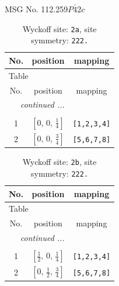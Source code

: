 \documentclass[fleqn,8pt]{jsarticle}
\begin{document}
\setcounter{MaxMatrixCols}{32}

\renewcommand{\tablename}{Table~}
\renewcommand{\figurename}{Figure~}
\begin{center}
\LARGE
MSG No. 112.259\quad$P\bar{4}2c$
\end{center}
\renewcommand{\arraystretch}{1.2}
\begin{longtable}{ccc}
\caption{Wyckoff site: {\tt 2a}, site symmetry: {\tt 222.}}
 \\
 \hline \hline
No. & position & mapping \\ \hline \endfirsthead

\multicolumn{2}{l}{\tablename\ \thetable{}} \\
 \hline \hline
No. & position & mapping \\ \hline \endhead

 \hline \hline
\multicolumn{2}{r}{\footnotesize\it continued ...} \\ \endfoot

 \hline \hline
\multicolumn{2}{r}{} \\ \endlastfoot

1 & $\left[ 0,\, 0,\, \frac{1}{4} \right]$ & {\tt [1,2,3,4]} \\ \hline
2 & $\left[ 0,\, 0,\, \frac{3}{4} \right]$ & {\tt [5,6,7,8]} \\
\end{longtable}
\renewcommand{\arraystretch}{1.2}
\begin{longtable}{ccc}
\caption{Wyckoff site: {\tt 2b}, site symmetry: {\tt 222.}}
 \\
 \hline \hline
No. & position & mapping \\ \hline \endfirsthead

\multicolumn{2}{l}{\tablename\ \thetable{}} \\
 \hline \hline
No. & position & mapping \\ \hline \endhead

 \hline \hline
\multicolumn{2}{r}{\footnotesize\it continued ...} \\ \endfoot

 \hline \hline
\multicolumn{2}{r}{} \\ \endlastfoot

1 & $\left[ \frac{1}{2},\, 0,\, \frac{1}{4} \right]$ & {\tt [1,2,3,4]} \\ \hline
2 & $\left[ 0,\, \frac{1}{2},\, \frac{3}{4} \right]$ & {\tt [5,6,7,8]} \\
\end{longtable}
\end{document}
